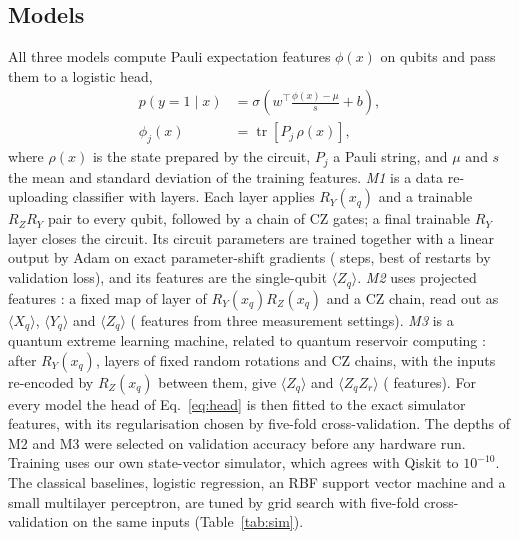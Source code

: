 \subsection{Models}
All three models compute Pauli expectation features $\phi(x)$ on  qubits and
pass them to a logistic head,
\begin{align}
p(y=1\mid x) &= \sigma\!\left(w^\top \frac{\phi(x)-\mu}{s}+b\right), \label{eq:head}\\
\phi_j(x) &= \operatorname{tr}\!\left[P_j\,\rho(x)\right], \nonumber
\end{align}
where $\rho(x)$ is the state prepared by the circuit, $P_j$ a Pauli string, and $\mu$ and $s$
the mean and standard deviation of the training features. \emph{M1} is a data re-uploading
classifier \cite{perezsalinas2020reuploading} with  layers. Each layer applies
$R_Y(x_q)$ and a trainable $R_Z R_Y$ pair to every qubit, followed by a chain of CZ gates; a
final trainable $R_Y$ layer closes the circuit. Its  circuit parameters are
trained together with a linear output by Adam on exact parameter-shift gradients
( steps, best of  restarts by validation loss), and its features
are the  single-qubit $\langle Z_q\rangle$. \emph{M2} uses projected features
\cite{huang2021power}: a fixed map of  layer of $R_Y(x_q)R_Z(x_q)$ and a CZ chain,
read out as $\langle X_q\rangle$, $\langle Y_q\rangle$ and $\langle Z_q\rangle$
( features from three measurement settings). \emph{M3} is a quantum extreme
learning machine, related to quantum reservoir computing \cite{yasuda2023qrc}: after $R_Y(x_q)$,
 layers of fixed random rotations and CZ chains, with the inputs re-encoded by
$R_Z(x_q)$ between them, give $\langle Z_q\rangle$ and $\langle Z_qZ_r\rangle$
( features). For every model the head of Eq.~\eqref{eq:head} is then fitted to
the exact simulator features, with its regularisation chosen by five-fold cross-validation. The
depths of M2 and M3 were selected on validation accuracy before any hardware run. Training uses
our own state-vector simulator, which agrees with Qiskit to $10^{-10}$. The classical
baselines, logistic regression, an RBF support vector machine and a small multilayer
perceptron, are tuned by grid search with five-fold cross-validation on the same inputs
(Table~\ref{tab:sim}).

